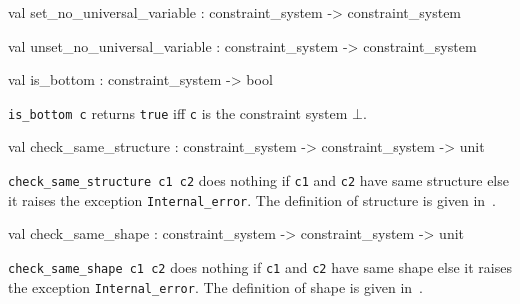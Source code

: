\label{val:Constraint-underscoresystem.set-underscoreno-underscoreuniversal-underscorevariable}\begin{ocamldoccode}
val set_no_universal_variable : constraint_system -> constraint_system
\end{ocamldoccode}




\label{val:Constraint-underscoresystem.unset-underscoreno-underscoreuniversal-underscorevariable}\begin{ocamldoccode}
val unset_no_universal_variable : constraint_system -> constraint_system
\end{ocamldoccode}




\label{val:Constraint-underscoresystem.is-underscorebottom}\begin{ocamldoccode}
val is_bottom : constraint_system -> bool
\end{ocamldoccode}
\begin{ocamldocdescription}
{\tt{is\_bottom c}} returns {\tt{true}} iff {\tt{c}} is the constraint system $\bot$. 


\end{ocamldocdescription}




\label{val:Constraint-underscoresystem.check-underscoresame-underscorestructure}\begin{ocamldoccode}
val check_same_structure : constraint_system ->
  constraint_system -> unit
\end{ocamldoccode}
\begin{ocamldocdescription}
{\tt{check\_same\_structure c1 c2}} does nothing if {\tt{c1}} and {\tt{c2}} have same structure else it raises 
    the exception {\tt{Internal\_error}}. The definition of structure is given in~. 


\end{ocamldocdescription}




\label{val:Constraint-underscoresystem.check-underscoresame-underscoreshape}\begin{ocamldoccode}
val check_same_shape : constraint_system ->
  constraint_system -> unit
\end{ocamldoccode}
\begin{ocamldocdescription}
{\tt{check\_same\_shape c1 c2}} does nothing if {\tt{c1}} and {\tt{c2}} have same shape else it raises 
    the exception {\tt{Internal\_error}}. The definition of shape is given in~. 


\end{ocamldocdescription}




